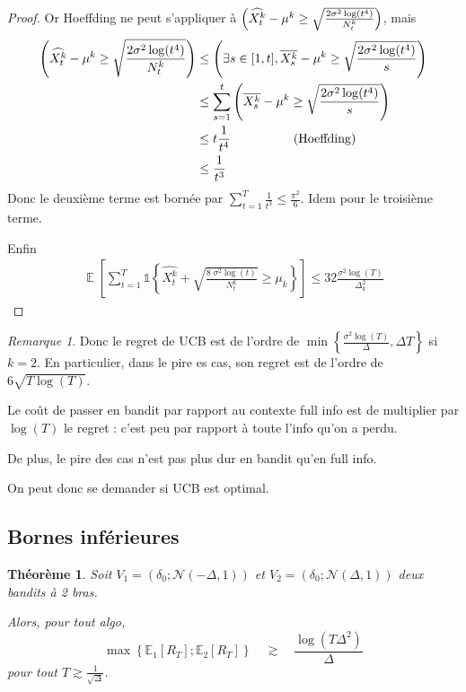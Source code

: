 \documentclass{article}
\DeclareMathOperator*{\E}{\mathbb{E}}
\let\P\relax
\DeclareMathOperator*{\P}{\mathbb{P}}
\newtheorem{theorem}{Théorème}[section]
\theoremstyle{remark}
\theoremstyle{remark}
\newtheorem{remark}{Remarque}[section]
\begin{document}
\begin{proof}
   Or Hoeffding ne peut s'appliquer à $\P\left( \widehat{X_t^k}-\mu^k \geq \sqrt{\frac{2 \sigma^2 \log(t^4)}{N_t^k}} \right)$, mais
   \begin{align*}
      \P\left( \widehat{X_t^k}-\mu^k \geq \sqrt{\frac{2 \sigma^2 \log(t^4)}{N_t^k}} \right) &\leq \P\left( \exists s \in [1, t], \overline{X_s^k} - \mu^k \geq \sqrt{\frac{2 \sigma^2 \log(t^4)}{s}} \right) \\
      &\leq \sum_{s=1}^t \P\left(\overline{X_s^k} - \mu^k \geq \sqrt{\frac{2 \sigma^2 \log(t^4)}{s}} \right) \\
      &\leq t \frac{1}{t^4} \quad \quad \quad \quad \quad \text{(Hoeffding)}\\
      &\leq \frac{1}{t^3}
   \end{align*}
   Donc le deuxième terme est bornée par $\sum\limits_{t=1}^T \frac{1}{t^3} \leq \frac{\pi^2}{6}$. Idem pour le troisième terme.

   Enfin
   \begin{align*}
      \E\left[ \sum_{t=1}^T \mathbb{1}\left\{ \widehat{X_t^k} + \sqrt{\frac{8 \; \sigma^2 \log(t)}{N_t^k}} \geq \mu_k\right\}\right] \leq 32 \frac{\sigma^2 \log(T)}{\Delta_k^2}
   \end{align*}
\end{proof}


\begin{remark}
   Donc le regret de UCB est de l'ordre de $\min\left\{\frac{\sigma^2 \log(T)}{\Delta}, \Delta T\right\}$ si $k=2$. En particulier, dans le pire es cas, son regret est de l'ordre de $6 \sqrt{T\log(T)}$.

   Le coût de passer en bandit par rapport au contexte full info est de multiplier par $\log(T)$ le regret : c'est peu par rapport à toute l'info qu'on a perdu.

   De plus, le pire des cas n'est pas plus dur en bandit qu'en full info.
\end{remark}

On peut donc se demander si UCB est optimal.

\subsection{Bornes inférieures}

\begin{theorem}
   Soit $V_1 = (\delta_0; \mathcal{N}(-\Delta, 1))$ et $V_2 = (\delta_0; \mathcal{N}(\Delta, 1))$ deux bandits à 2 bras.

   Alors, pour tout algo,
   $$
   \max\left\{ \mathbb{E}_1[R_T]; \mathbb{E}_2[R_T] \right\} \quad \gtrsim \quad \frac{\log(T \Delta^2)}{\Delta}
   $$
   pour tout $T \gtrsim \frac{1}{\sqrt{\Delta}}$.
\end{theorem}
\end{document}
